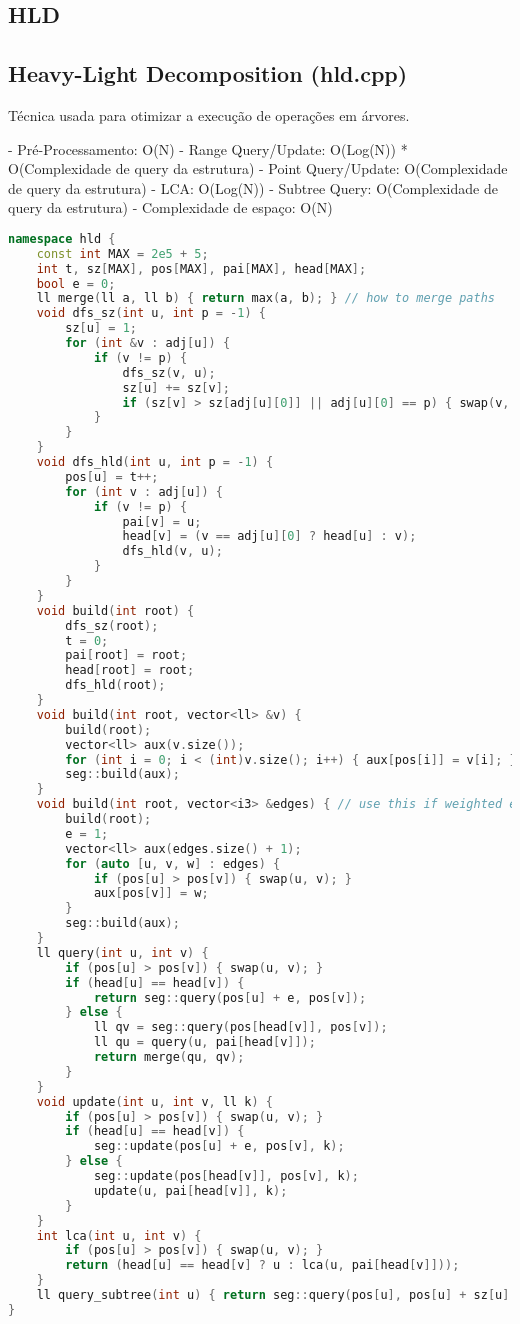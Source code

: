 \documentclass[11pt, a4paper, twoside]{article}
\begin{document}
\subsection{HLD}

\subsection{Heavy-Light Decomposition (hld.cpp)}


Técnica usada para otimizar a execução de operações em árvores.

- Pré-Processamento: O(N)
- Range Query/Update: O(Log(N)) * O(Complexidade de query da estrutura)
- Point Query/Update: O(Complexidade de query da estrutura)
- LCA: O(Log(N))
- Subtree Query: O(Complexidade de query da estrutura)
- Complexidade de espaço: O(N)


\begin{lstlisting}[language=C++]
namespace hld {
    const int MAX = 2e5 + 5;
    int t, sz[MAX], pos[MAX], pai[MAX], head[MAX];
    bool e = 0;
    ll merge(ll a, ll b) { return max(a, b); } // how to merge paths
    void dfs_sz(int u, int p = -1) {
        sz[u] = 1;
        for (int &v : adj[u]) {
            if (v != p) {
                dfs_sz(v, u);
                sz[u] += sz[v];
                if (sz[v] > sz[adj[u][0]] || adj[u][0] == p) { swap(v, adj[u][0]); }
            }
        }
    }
    void dfs_hld(int u, int p = -1) {
        pos[u] = t++;
        for (int v : adj[u]) {
            if (v != p) {
                pai[v] = u;
                head[v] = (v == adj[u][0] ? head[u] : v);
                dfs_hld(v, u);
            }
        }
    }
    void build(int root) {
        dfs_sz(root);
        t = 0;
        pai[root] = root;
        head[root] = root;
        dfs_hld(root);
    }
    void build(int root, vector<ll> &v) {
        build(root);
        vector<ll> aux(v.size());
        for (int i = 0; i < (int)v.size(); i++) { aux[pos[i]] = v[i]; }
        seg::build(aux);
    }
    void build(int root, vector<i3> &edges) { // use this if weighted edges
        build(root);
        e = 1;
        vector<ll> aux(edges.size() + 1);
        for (auto [u, v, w] : edges) {
            if (pos[u] > pos[v]) { swap(u, v); }
            aux[pos[v]] = w;
        }
        seg::build(aux);
    }
    ll query(int u, int v) {
        if (pos[u] > pos[v]) { swap(u, v); }
        if (head[u] == head[v]) {
            return seg::query(pos[u] + e, pos[v]);
        } else {
            ll qv = seg::query(pos[head[v]], pos[v]);
            ll qu = query(u, pai[head[v]]);
            return merge(qu, qv);
        }
    }
    void update(int u, int v, ll k) {
        if (pos[u] > pos[v]) { swap(u, v); }
        if (head[u] == head[v]) {
            seg::update(pos[u] + e, pos[v], k);
        } else {
            seg::update(pos[head[v]], pos[v], k);
            update(u, pai[head[v]], k);
        }
    }
    int lca(int u, int v) {
        if (pos[u] > pos[v]) { swap(u, v); }
        return (head[u] == head[v] ? u : lca(u, pai[head[v]]));
    }
    ll query_subtree(int u) { return seg::query(pos[u], pos[u] + sz[u] - 1); }
}
\end{lstlisting}
\end{document}
